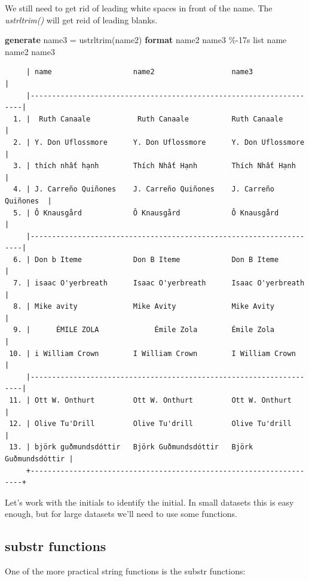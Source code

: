\documentclass[
]{book}
\newenvironment{Shaded}{\begin{snugshade}}{\end{snugshade}}
\newcommand{\BaseNTok}[1]{\textcolor[rgb]{0.00,0.00,0.81}{#1}}
\newcommand{\KeywordTok}[1]{\textcolor[rgb]{0.13,0.29,0.53}{\textbf{#1}}}
\newcommand{\NormalTok}[1]{#1}
\newcommand{\OtherTok}[1]{\textcolor[rgb]{0.56,0.35,0.01}{#1}}
\begin{document}
We still need to get rid of leading white spaces in front of the name. The \emph{ustrltrim()} will get reid of leading blanks.

\begin{Shaded}
\begin{Highlighting}[]
\KeywordTok{generate}\NormalTok{ name3 = ustrltrim(name2)}
\KeywordTok{format}\NormalTok{ name2 name3 \%{-}17s}
\OtherTok{list} \BaseNTok{name}\NormalTok{ name2 name3}
\end{Highlighting}
\end{Shaded}

\begin{verbatim}
     | name                   name2                  name3                |
     |--------------------------------------------------------------------|
  1. |  Ruth Canaale           Ruth Canaale          Ruth Canaale         |
  2. | Y. Don Uflossmore      Y. Don Uflossmore      Y. Don Uflossmore    |
  3. | thích nhất hạnh        Thích Nhất Hạnh        Thích Nhất Hạnh      |
  4. | J. Carreño Quiñones    J. Carreño Quiñones    J. Carreño Quiñones  |
  5. | Ô Knausgård            Ô Knausgård            Ô Knausgård          |
     |--------------------------------------------------------------------|
  6. | Don b Iteme            Don B Iteme            Don B Iteme          |
  7. | isaac O'yerbreath      Isaac O'yerbreath      Isaac O'yerbreath    |
  8. | Mike avity             Mike Avity             Mike Avity           |
  9. |      ÉMILE ZOLA             Émile Zola        Émile Zola           |
 10. | i William Crown        I William Crown        I William Crown      |
     |--------------------------------------------------------------------|
 11. | Ott W. Onthurt         Ott W. Onthurt         Ott W. Onthurt       |
 12. | Olive Tu'Drill         Olive Tu'drill         Olive Tu'drill       |
 13. | björk guðmundsdóttir   Björk Guðmundsdóttir   Björk Guðmundsdóttir |
     +--------------------------------------------------------------------+
\end{verbatim}

Let's work with the initials to identify the initial. In small datasets this is easy enough, but for large datasets we'll need to use some functions.

\subsection{substr functions}\label{substr-functions}

One of the more practical string functions is the substr functions:
\end{document}
